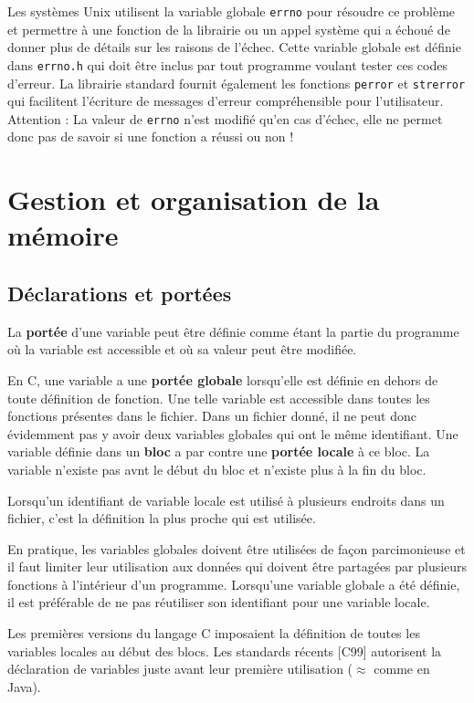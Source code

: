 Les systèmes Unix utilisent la variable globale \texttt{errno} pour résoudre ce problème et permettre à une fonction de la librairie ou un appel système qui a échoué de donner plus de détails sur les raisons de l'échec.
Cette variable globale est définie dans \texttt{errno.h} qui doit être inclus par tout programme voulant tester ces codes d'erreur.
La librairie standard fournit également les fonctions \texttt{perror} et \texttt{strerror} qui facilitent l'écriture de messages d'erreur compréhensible pour l'utilisateur. \\
Attention : La valeur de \texttt{errno} n'est modifié qu'en cas d'échec, elle ne permet donc pas de savoir si une fonction a réussi ou non !



\section{Gestion et organisation de la mémoire}
\subsection{Déclarations et portées}
La \textbf{portée} d'une variable peut être définie comme étant la partie du programme où la variable est accessible et où sa valeur peut être modifiée.

En C, une variable a une \textbf{portée globale} lorsqu'elle est définie en dehors de toute définition de fonction.
Une telle variable est accessible dans toutes les fonctions présentes dans le fichier.
Dans un fichier donné, il ne peut donc évidemment pas y avoir deux variables globales qui ont le même identifiant.
Une variable définie dans un \textbf{bloc} a par contre une \textbf{portée locale} à ce bloc.
La variable n'existe pas avnt le début du bloc et n'existe plus à la fin du bloc.

Lorsqu'un identifiant de variable locale est utilisé à plusieurs endroits dans un fichier, c'est la définition la plus proche qui est utilisée.

En pratique, les variables globales doivent être utilisées de façon parcimonieuse et il faut limiter leur utilisation aux données qui doivent être partagées par plusieurs fonctions à l'intérieur d'un programme.
Lorsqu'une variable globale a été définie, il est préférable de ne pas réutiliser son identifiant pour une variable locale.

Les premières versions du langage C imposaient la définition de toutes les variables locales au début des blocs.
Les standards récents [C99] autorisent la déclaration de variables juste avant leur première utilisation ($\approx$ comme en Java).

